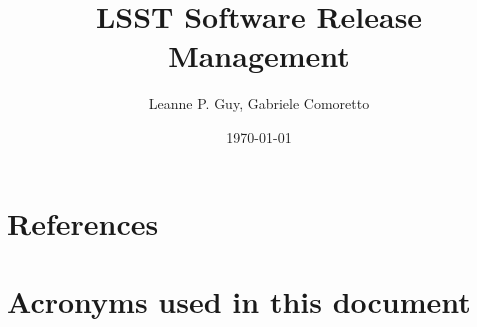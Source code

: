 \documentclass[DM,lsstdraft,toc]{lsstdoc}
\title{LSST Software Release Management}
\author{%
Leanne P. Guy, Gabriele Comoretto
}
\date{\today}
\begin{document}
\maketitle





\appendix
\section{References} \label{sec:bib}


\section{Acronyms used in this document}\label{sec:acronyms}

\end{document}
